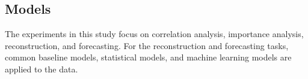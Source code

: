 %
%
%
%
%
%
%
%
%
%

\subsection{Models}

The experiments in this study focus on correlation analysis, importance analysis, reconstruction, and forecasting. For the reconstruction and forecasting tasks, common baseline models, statistical models, and machine learning models are applied to the data.

